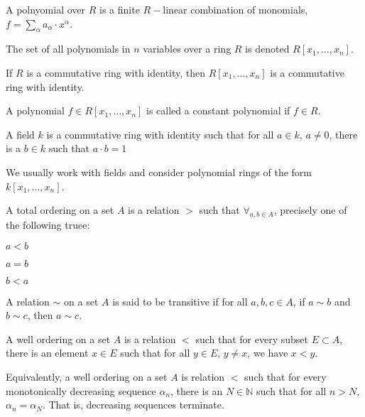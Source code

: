 \documentclass[crop=false,class=book,oneside]{standalone}
\begin{document}
\begin{definition}
A polnyomial over $R$ is a finite $R-$linear combination of monomials, $f=\sum_{\alpha} a_{\alpha} \cdot x^{\alpha}$.
\end{definition}
\begin{notation}
The set of all polynomials in $n$ variables over a ring $R$ is denoted $R[x_1,\hdots, x_n]$.
\end{notation}
\begin{theorem}
If $R$ is a commutative ring with identity, then $R[x_1,\hdots, x_n]$ is a commutative ring with identity.
\end{theorem}
\begin{definition}
A polynomial $f\in R[x_1,\hdots, x_n]$ is called a constant polynomial if $f\in R$.
\end{definition}
\begin{definition}
A field $k$ is a commutative ring with identity such that for all $a\in k$, $a\ne 0$, there is a $b\in k$ such that $a\cdot b=1$
\end{definition}
\begin{remark}
We usually work with fields and consider polynomial rings of the form $k[x_1,\hdots ,x_n]$.
\end{remark}
\begin{definition}
A total ordering on a set $A$ is a relation $>$ such that $\forall_{a,b\in A}$, precisely one of the following truee:
\begin{enumerate}
    \begin{multicols}{3}
    \item $a<b$
    \item $a=b$
    \item $b<a$
    \end{multicols}
\end{enumerate}
\end{definition}
\begin{definition}
A relation $\sim$ on a set $A$ is said to be transitive if for all $a,b,c\in A$, if $a\sim b$ and $b\sim c$, then $a\sim c$.
\end{definition}
\begin{definition}
A well ordering on a set $A$ is a relation $<$ such that for every subset $E\subset A$, there is an element $x\in E$ such that for all $y\in E$, $y\ne x$, we have $x<y$.
\end{definition}
\begin{remark}
Equivalently, a well ordering on a set $A$ is relation $<$ such that for every monotonically decreasing sequence $\alpha_n$, there is an $N\in \mathbb{N}$ such that for all $n>N$, $\alpha_n = \alpha_N$. That is, decreasing sequences terminate.
\end{remark}
\end{document}
